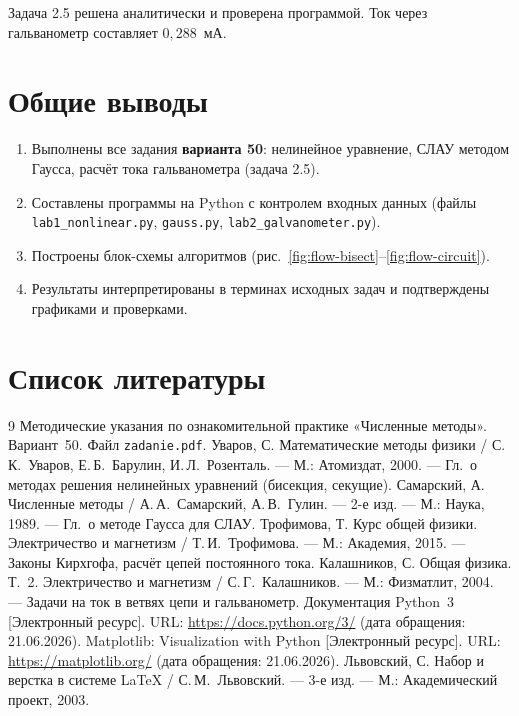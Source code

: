 \documentclass[12pt,a4paper]{scrartcl}
\begin{document}
Задача 2.5 решена аналитически и проверена программой. Ток через гальванометр составляет $0{,}288$~мА.

\newpage
\section{Общие выводы}

\begin{enumerate}
 \item Выполнены все задания \textbf{варианта 50}: нелинейное уравнение, СЛАУ методом Гаусса, расчёт тока гальванометра (задача 2.5).
 \item Составлены программы на Python с контролем входных данных (файлы \texttt{lab1\_nonlinear.py}, \texttt{gauss.py}, \texttt{lab2\_galvanometer.py}).
 \item Построены блок-схемы алгоритмов (рис.~\ref{fig:flow-bisect}--\ref{fig:flow-circuit}).
 \item Результаты интерпретированы в терминах исходных задач и подтверждены графиками и проверками.
\end{enumerate}

\newpage
\section{Список литературы}

\begin{thebibliography}{9}
Методические указания по ознакомительной практике «Численные методы». Вариант~50. Файл \texttt{zadanie.pdf}.
Уваров, С. Математические методы физики / С.\,К.~Уваров, Е.\,Б.~Барулин, И.\,Л.~Розенталь. --- М.: Атомиздат, 2000. --- Гл.~о методах решения нелинейных уравнений (бисекция, секущие).
Самарский, А. Численные методы / А.\,А.~Самарский, А.\,В.~Гулин. --- 2-е изд. --- М.: Наука, 1989. --- Гл.~о методе Гаусса для СЛАУ.
Трофимова, Т. Курс общей физики. Электричество и магнетизм / Т.\,И.~Трофимова. --- М.: Академия, 2015. --- Законы Кирхгофа, расчёт цепей постоянного тока.
Калашников, С. Общая физика. Т.~2. Электричество и магнетизм / С.\,Г.~Калашников. --- М.: Физматлит, 2004. --- Задачи на ток в ветвях цепи и гальванометр.
Документация Python~3 [Электронный ресурс]. URL: \url{https://docs.python.org/3/} (дата обращения: 21.06.2026).
Matplotlib: Visualization with Python [Электронный ресурс]. URL: \url{https://matplotlib.org/} (дата обращения: 21.06.2026).
Львовский, С. Набор и верстка в системе \LaTeX{} / С.\,М.~Львовский. --- 3-е изд. --- М.: Академический проект, 2003.
\end{thebibliography}
\end{document}
